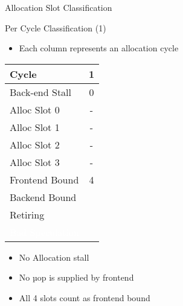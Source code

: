 \documentclass[aspectratio=169,10pt]{beamer}
\begin{document}
\begin{frame}{Allocation Slot Classification}
\begin{center}
\end{center}
\end{frame}

\begin{frame}{Per Cycle Classification (1)}
\begin{itemize}
  \item Each column represents an allocation cycle
\end{itemize}

\begin{center}
\begin{tabular}{|l|c|}
\hline
\rowcolor{red!20} Cycle & 1 \\
\hline
\rowcolor{red!20} Back-end Stall & 0 \\
\hline
\rowcolor{greenbar!50} Alloc Slot 0 & - \\
\hline
\rowcolor{greenbar!50} Alloc Slot 1 & - \\
\hline
\rowcolor{greenbar!50} Alloc Slot 2 & - \\
\hline
\rowcolor{greenbar!50} Alloc Slot 3 & - \\
\hline
\rowcolor{frontendbound} Frontend Bound & 4 \\
\hline
\rowcolor{backendbound} Backend Bound & \\
\hline
\rowcolor{retiring} Retiring & \\
\hline
\rowcolor{badspec} \textcolor{white}{Bad Speculation} & \\
\hline
\end{tabular}
\end{center}

\begin{itemize}
  \item No Allocation stall
  \item No µop is supplied by frontend
  \item All 4 slots count as frontend bound
\end{itemize}
\end{frame}
\end{document}
